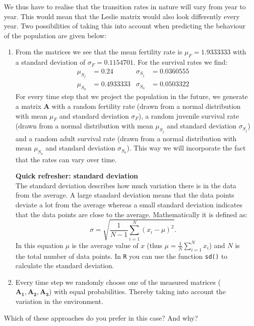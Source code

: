 \documentclass{article}\usepackage[]{graphicx}\usepackage[]{color}
\begin{document}
We thus have to realise that the transition rates in nature will vary from year to year. This would mean that the Leslie matrix would also look differently every year. Two possibilities of taking this into account when predicting the behaviour of the population are given below:
\begin{enumerate}
\item From the matrices we see that the mean fertility rate is $\mu_{F} = 1.9333333$ with a standard deviation of $\sigma_{F} = 0.1154701$. For the survival rates we find:
\begin{align*}
\mu_{S_j} &= 0.24 & \sigma_{S_j} &= 0.0360555\\
\mu_{S_a} &= 0.4933333 & \sigma_{S_a} &= 0.0503322
\end{align*}
For every time step that we project the population in the future, we generate a matrix $\boldsymbol{A}$ with a random fertility rate (drawn from a normal distribution with mean $\mu_F$ and standard deviation $\sigma_F$), a random juvenile survival rate (drawn from a normal distribution with mean $\mu_{S_j}$ and standard deviation $\sigma_{S_j}$) and a random adult survival rate (drawn from a normal distribution with mean $\mu_{S_a}$ and standard deviation $\sigma_{S_a}$). This way we will incorporate the fact that the rates can vary over time.
\begin{mdframed}
\textbf{Quick refresher: standard deviation}\\
The standard deviation describes how much variation there is in the data from the average. A large standard deviation means that the data points deviate a lot from the average whereas a small standard deviation indicates that the data points are close to the average. Mathematically it is defined as:
\begin{equation*}
\sigma = \sqrt{\frac{1}{N-1}\sum_{i=1}^{N}{(x_i-\mu)^2}}.
\end{equation*}
In this equation $\mu$ is the average value of $x$ (thus $\mu=\frac{1}{N}\sum_{i=1}^{N}{x_i}$) and $N$ is the total number of data points. In \texttt{R} you can use the function \texttt{sd()} to calculate the standard deviation.
\end{mdframed}
\item Every time step we randomly choose one of the measured matrices ($\boldsymbol{A_1,A_2,A_3}$) with equal probabilities. Thereby taking into account the variation in the environment.
\end{enumerate}
Which of these approaches do you prefer in this case? And why?
\end{document}
